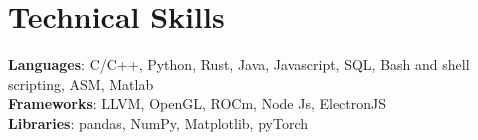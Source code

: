 \documentclass[letterpaper,11pt]{article}
\begin{document}
\section{Technical Skills}
 \begin{itemize}[leftmargin=0.15in, label={}]
    \small{\item{
     \textbf{Languages}{: C/C++, Python, Rust, Java, Javascript, SQL, Bash and shell scripting, ASM, Matlab} \\
     \textbf{Frameworks}{: LLVM, OpenGL, ROCm, Node Js,  ElectronJS} \\
      \textbf{Libraries}{: pandas, NumPy, Matplotlib, pyTorch}
    }}
 \end{itemize}


\end{document}
